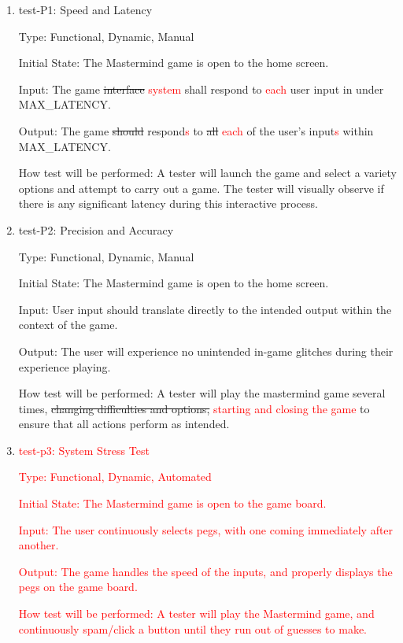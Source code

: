 \documentclass[12pt, titlepage]{article}
\begin{document}
\begin{enumerate}

\item{test-P1: Speed and Latency\\}

Type: Functional, Dynamic, Manual
					
Initial State: The Mastermind game is open to the home screen.
				
Input: The game 
\sout{interface} \textcolor{red}{system} shall respond to \textcolor{red}{each} user input in under MAX\_LATENCY.
					
Output: The game \sout{should} respond\textcolor{red}{s} to \sout{all} \textcolor{red}{each} of the user's input\textcolor{red}{s} within MAX\_LATENCY.
					
How test will be performed: A tester will launch the game and select a variety options and attempt to carry out a game. The tester will visually observe if there is any significant latency during this interactive process.


\item{test-P2: Precision and Accuracy\\}

Type: Functional, Dynamic, Manual
					
Initial State: The Mastermind game is open to the home screen.
					
Input: User input should translate directly to the intended output within
the context of the game.
					
Output: The user will experience no unintended in-game glitches during their experience playing.
					
How test will be performed: A tester will play the mastermind game several times, \sout{changing difficulties and options,} \textcolor{red}{starting and closing the game} to ensure that all actions perform as intended.

\item{\textcolor{red}{test-p3: System Stress Test}\\}

\textcolor{red}{
Type: Functional, Dynamic, Automated}

\textcolor{red}{Initial State: The Mastermind game is open to the game board.}

\textcolor{red}{Input: The user continuously selects pegs, with one coming immediately after another.}

\textcolor{red}{Output: The game handles the speed of the inputs, and properly displays the pegs on the game board.}

\textcolor{red}{How test will be performed: A tester will play the Mastermind game, and continuously spam/click a button until they run out of guesses to make.
}

\end{enumerate}
\end{document}
